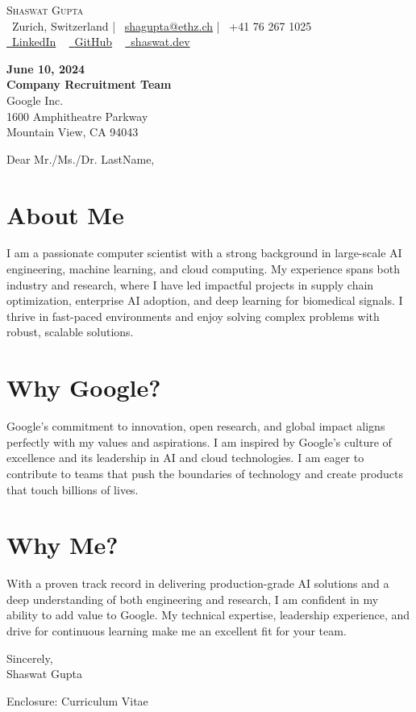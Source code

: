 \documentclass[letterpaper,10pt]{article}
\makeatletter
\newcommand{\icontext}[2]{\raisebox{-0.2\height}{#1}~#2}
\newcommand{\headerinfo}{
    \begin{center}
        {\Huge \textcolor{accentblue}{\scshape Shaswat Gupta}} \\[2pt]
        \icontext{\faMapMarker}{Zurich, Switzerland} \quad | \quad
        \icontext{\faEnvelope}{\href{mailto:shagupta@ethz.ch}{shagupta@ethz.ch}} \quad | \quad
        \icontext{\faPhone}{+41 76 267 1025} \\[1pt]
        \small
        \href{https://linkedin.com/in/shaswat-gupta/}{\icontext{\faLinkedin}{\textcolor{accentblue}{LinkedIn}}} ~
        \href{https://github.com/Shaswat-G}{\icontext{\faGithub}{\textcolor{accentblue}{GitHub}}} ~
        \href{https://shaswat.dev}{\icontext{\faGlobe}{\textcolor{accentblue}{shaswat.dev}}}
        \vspace{-8pt}
    \end{center}
    }
\newcommand{\letterSection}[1]{
    \section*{#1}
    \vspace{-6pt}
    }
\makeatother
\begin{document}
    \headerinfo

    \vspace{8pt}

    {\color{mutedtext}
    \textbf{June 10, 2024} \\[2pt]
    \textbf{Company Recruitment Team} \\
    Google Inc. \\
    1600 Amphitheatre Parkway \\
    Mountain View, CA 94043
    }

    \vspace{16pt}

    {\color{headercolor}
    Dear Mr./Ms./Dr. LastName,
    }

    \vspace{12pt}

    \letterSection{About Me}
    I am a passionate computer scientist with a strong background in large-scale AI engineering, machine learning, and cloud computing. My experience spans both industry and research, where I have led impactful projects in supply chain optimization, enterprise AI adoption, and deep learning for biomedical signals. I thrive in fast-paced environments and enjoy solving complex problems with robust, scalable solutions.

    \letterSection{Why Google?}
    Google's commitment to innovation, open research, and global impact aligns perfectly with my values and aspirations. I am inspired by Google's culture of excellence and its leadership in AI and cloud technologies. I am eager to contribute to teams that push the boundaries of technology and create products that touch billions of lives.

    \letterSection{Why Me?}
    With a proven track record in delivering production-grade AI solutions and a deep understanding of both engineering and research, I am confident in my ability to add value to Google. My technical expertise, leadership experience, and drive for continuous learning make me an excellent fit for your team.

    \vspace{16pt}

    {\color{headercolor}
    Sincerely,\\[12pt]
    Shaswat Gupta
    }

    \vspace{8pt}
    {\color{mutedtext}
    Enclosure: Curriculum Vitae
    }

    
\end{document}
